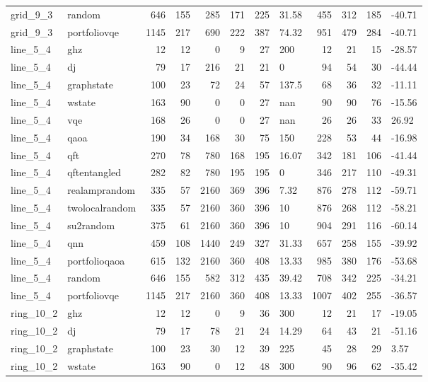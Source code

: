 \begin{longtable}{llrrrrrlrrrl}
grid\_9\_3 & random & 646 & 155 & 285 & 171 & 225 & 31.58 & 455 & 312 & 185 & -40.71 \\
grid\_9\_3 & portfoliovqe & 1145 & 217 & 690 & 222 & 387 & 74.32 & 951 & 479 & 284 & -40.71 \\
line\_5\_4 & ghz & 12 & 12 & 0 & 9 & 27 & 200 & 12 & 21 & 15 & -28.57 \\
line\_5\_4 & dj & 79 & 17 & 216 & 21 & 21 & 0 & 94 & 54 & 30 & -44.44 \\
line\_5\_4 & graphstate & 100 & 23 & 72 & 24 & 57 & 137.5 & 68 & 36 & 32 & -11.11 \\
line\_5\_4 & wstate & 163 & 90 & 0 & 0 & 27 & nan & 90 & 90 & 76 & -15.56 \\
line\_5\_4 & vqe & 168 & 26 & 0 & 0 & 27 & nan & 26 & 26 & 33 & 26.92 \\
line\_5\_4 & qaoa & 190 & 34 & 168 & 30 & 75 & 150 & 228 & 53 & 44 & -16.98 \\
line\_5\_4 & qft & 270 & 78 & 780 & 168 & 195 & 16.07 & 342 & 181 & 106 & -41.44 \\
line\_5\_4 & qftentangled & 282 & 82 & 780 & 195 & 195 & 0 & 346 & 217 & 110 & -49.31 \\
line\_5\_4 & realamprandom & 335 & 57 & 2160 & 369 & 396 & 7.32 & 876 & 278 & 112 & -59.71 \\
line\_5\_4 & twolocalrandom & 335 & 57 & 2160 & 360 & 396 & 10 & 876 & 268 & 112 & -58.21 \\
line\_5\_4 & su2random & 375 & 61 & 2160 & 360 & 396 & 10 & 904 & 291 & 116 & -60.14 \\
line\_5\_4 & qnn & 459 & 108 & 1440 & 249 & 327 & 31.33 & 657 & 258 & 155 & -39.92 \\
line\_5\_4 & portfolioqaoa & 615 & 132 & 2160 & 360 & 408 & 13.33 & 985 & 380 & 176 & -53.68 \\
line\_5\_4 & random & 646 & 155 & 582 & 312 & 435 & 39.42 & 708 & 342 & 225 & -34.21 \\
line\_5\_4 & portfoliovqe & 1145 & 217 & 2160 & 360 & 408 & 13.33 & 1007 & 402 & 255 & -36.57 \\
ring\_10\_2 & ghz & 12 & 12 & 0 & 9 & 36 & 300 & 12 & 21 & 17 & -19.05 \\
ring\_10\_2 & dj & 79 & 17 & 78 & 21 & 24 & 14.29 & 64 & 43 & 21 & -51.16 \\
ring\_10\_2 & graphstate & 100 & 23 & 30 & 12 & 39 & 225 & 45 & 28 & 29 & 3.57 \\
ring\_10\_2 & wstate & 163 & 90 & 0 & 12 & 48 & 300 & 90 & 96 & 62 & -35.42 \\

\end{longtable}
